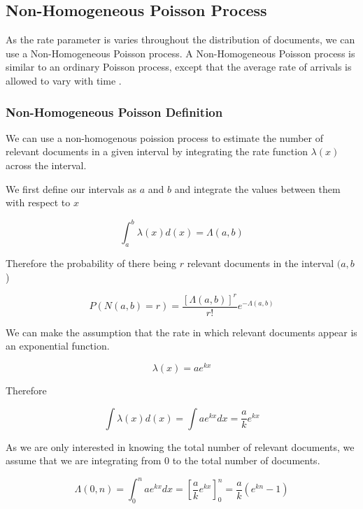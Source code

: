 \subsection{Non-Homogeneous Poisson Process}

As the rate parameter is varies throughout the distribution of documents, we can use a Non-Homogeneous Poisson process. A Non-Homogeneous Poisson process is similar to an ordinary Poisson process, except that the average rate of arrivals is allowed to vary with time \cite{nonhomp}. 


\subsubsection{Non-Homogeneous Poisson Definition} \label{nn_pp_def}

We can use a non-homogenous poission process to estimate the number of relevant documents in a given interval by integrating the rate function $\lambda(x)$ across the interval.

We first define our intervals as $a$ and $b$ and integrate the values between them with respect to $x$

\begin{equation}
	   \int_a^b \lambda(x) d(x) = \Lambda(a, b)
\end{equation}

Therefore the probability of there being $r$ relevant documents in the interval $(a, b$)

\begin{equation}
	   P(N(a, b) = r) = \frac{[\Lambda(a,b)]^r}{r!} e^{-\Lambda(a,b)}
\end{equation}

We can make the assumption that the rate in which relevant documents appear is an exponential function.

\begin{equation}
	   \lambda(x) = ae^{kx}
\end{equation}

Therefore

\begin{equation}
	   \int \lambda(x) d(x) = \int ae^{kx} dx = \frac{a}{k}e^{kx}
\end{equation}

As we are only interested in knowing the total number of relevant documents, we assume that we are integrating from 0 to the total number of documents.

\begin{equation}
	   \Lambda(0, n) = \int_0^n ae^{kx}dx = \left[\frac{a}{k}e^{kx}\right]_0^n = \frac{a}{k}(e^{kn} - 1)
\end{equation}

